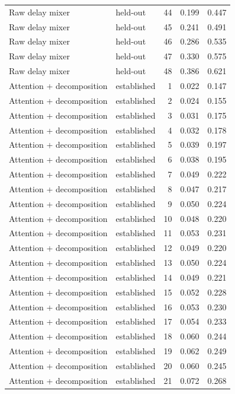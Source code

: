 \begin{tabular}{llrrr}
Raw delay mixer & held-out & 44 & 0.199 & 0.447 \\
Raw delay mixer & held-out & 45 & 0.241 & 0.491 \\
Raw delay mixer & held-out & 46 & 0.286 & 0.535 \\
Raw delay mixer & held-out & 47 & 0.330 & 0.575 \\
Raw delay mixer & held-out & 48 & 0.386 & 0.621 \\
Attention + decomposition & established & 1 & 0.022 & 0.147 \\
Attention + decomposition & established & 2 & 0.024 & 0.155 \\
Attention + decomposition & established & 3 & 0.031 & 0.175 \\
Attention + decomposition & established & 4 & 0.032 & 0.178 \\
Attention + decomposition & established & 5 & 0.039 & 0.197 \\
Attention + decomposition & established & 6 & 0.038 & 0.195 \\
Attention + decomposition & established & 7 & 0.049 & 0.222 \\
Attention + decomposition & established & 8 & 0.047 & 0.217 \\
Attention + decomposition & established & 9 & 0.050 & 0.224 \\
Attention + decomposition & established & 10 & 0.048 & 0.220 \\
Attention + decomposition & established & 11 & 0.053 & 0.231 \\
Attention + decomposition & established & 12 & 0.049 & 0.220 \\
Attention + decomposition & established & 13 & 0.050 & 0.224 \\
Attention + decomposition & established & 14 & 0.049 & 0.221 \\
Attention + decomposition & established & 15 & 0.052 & 0.228 \\
Attention + decomposition & established & 16 & 0.053 & 0.230 \\
Attention + decomposition & established & 17 & 0.054 & 0.233 \\
Attention + decomposition & established & 18 & 0.060 & 0.244 \\
Attention + decomposition & established & 19 & 0.062 & 0.249 \\
Attention + decomposition & established & 20 & 0.060 & 0.245 \\
Attention + decomposition & established & 21 & 0.072 & 0.268 \\

\end{tabular}
